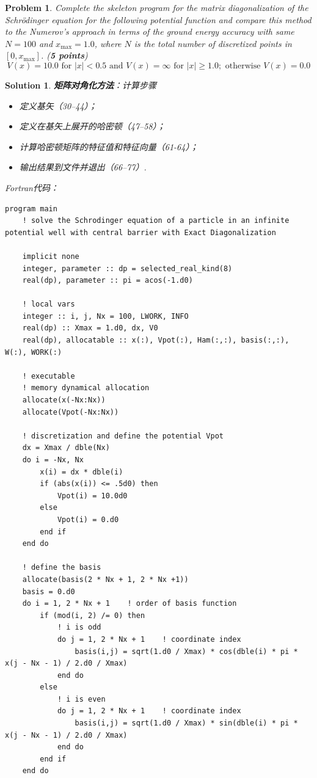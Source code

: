 \documentclass[UTF8,10pt,a4paper]{article}
\theoremstyle{Problem}
\newtheorem{prob}{Problem}
\theoremstyle{Solution}
\newtheorem*{sol}{Solution}
\providecommand{\abs}[1]{\left\lvert#1\right\rvert}
\begin{document}
\begin{prob}
    Complete the skeleton program for the matrix diagonalization of the Schrödinger equation for the following potential function and compare this method to the Numerov's approach in terms of the ground energy accuracy with same $N=100$ and $x_{\max}=1.0$, where $N$ is the total number of discretized points in $[0,x_{\max}]$. (\textbf{5 points})
    \begin{equation}
        V(x)=10.0\text{ for }\abs{x}<0.5\text{ and }V(x)=\infty\text{ for }\abs{x}\geq 1.0;\text{ otherwise }V(x)=0.0
    \end{equation}
\end{prob}
\begin{sol}
    \textbf{矩阵对角化方法}：计算步骤
    \begin{itemize}
        \item 定义基矢（30--44）；
        \item 定义在基矢上展开的哈密顿（47--58）；
        \item 计算哈密顿矩阵的特征值和特征向量（61-64）；
        \item 输出结果到文件并退出（66--77）.
    \end{itemize}
    Fortran代码：
    \begin{lstlisting}
program main
    ! solve the Schrodinger equation of a particle in an infinite potential well with central barrier with Exact Diagonalization

    implicit none
    integer, parameter :: dp = selected_real_kind(8)
    real(dp), parameter :: pi = acos(-1.d0)

    ! local vars
    integer :: i, j, Nx = 100, LWORK, INFO
    real(dp) :: Xmax = 1.d0, dx, V0
    real(dp), allocatable :: x(:), Vpot(:), Ham(:,:), basis(:,:), W(:), WORK(:)

    ! executable
    ! memory dynamical allocation
    allocate(x(-Nx:Nx))
    allocate(Vpot(-Nx:Nx))

    ! discretization and define the potential Vpot
    dx = Xmax / dble(Nx)
    do i = -Nx, Nx
        x(i) = dx * dble(i)
        if (abs(x(i)) <= .5d0) then
            Vpot(i) = 10.0d0
        else
            Vpot(i) = 0.d0
        end if
    end do

    ! define the basis
    allocate(basis(2 * Nx + 1, 2 * Nx +1))
    basis = 0.d0
    do i = 1, 2 * Nx + 1    ! order of basis function
        if (mod(i, 2) /= 0) then
            ! i is odd
            do j = 1, 2 * Nx + 1    ! coordinate index
                basis(i,j) = sqrt(1.d0 / Xmax) * cos(dble(i) * pi * x(j - Nx - 1) / 2.d0 / Xmax)
            end do
        else
            ! i is even
            do j = 1, 2 * Nx + 1    ! coordinate index
                basis(i,j) = sqrt(1.d0 / Xmax) * sin(dble(i) * pi * x(j - Nx - 1) / 2.d0 / Xmax)
            end do
        end if
    end do


\end{lstlisting}
\end{sol}
\end{document}
